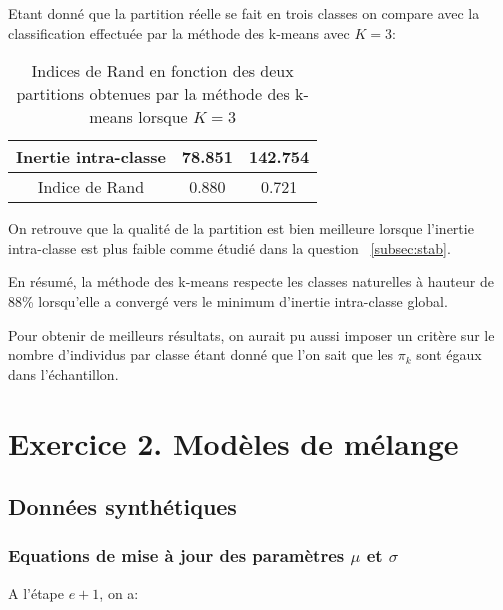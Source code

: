 \documentclass{article}
\begin{document}
\begin{multicols}{2}
Etant donné que la partition réelle se fait en trois classes on compare avec la
classification effectuée par la méthode des k-means avec $K = 3$:

\begin{table}[H]
\begin{center}
    \centering
    \captionsetup{justification=centering}
    \caption{\label{tab:randIndex}Indices de Rand en fonction des deux partitions obtenues par la méthode des k-means lorsque $K = 3$}
    \begin{tabular}{|c|c|c|}
        \hline
        Inertie intra-classe & 78.851 & 142.754 \\
        \hline
        Indice de Rand & 0.880 & 0.721 \\
        \hline
    \end{tabular}
\end{center}
\end{table}

On retrouve que la qualité de la partition est bien meilleure lorsque l'inertie
intra-classe est plus faible comme étudié dans la question ~\ref{subsec:stab}.

En résumé, la méthode des k-means respecte les classes naturelles à hauteur de
88\% lorsqu'elle a convergé vers le minimum d'inertie intra-classe global.

Pour obtenir de meilleurs résultats, on aurait pu aussi imposer un critère sur
le nombre d'individus par classe étant donné que l'on sait que les $\pi_k$ sont
égaux dans l'échantillon.


\section{Exercice 2. Modèles de mélange}\label{sec:ex2}

\subsection{Données synthétiques}\label{subsec:ex21}

\subsubsection{Equations de mise à jour des paramètres $\mu$ et $\sigma$}\label{subsubsec:ex211}

A l'étape $e + 1$, on a:


\end{multicols}
\end{document}
